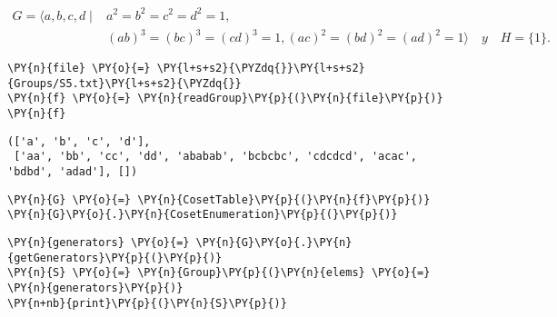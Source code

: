 
\iffalse
\newpage 
\begin{align*}
   G = \langle a,b,c,d \; | \; & a^2 = b^2 = c^2 = d^2 = 1,  \\
                            &(ab)^3 = (bc)^3 = (cd)^3 = 1, (ac)^2 = (bd)^2 = (ad)^2 = 1\rangle \quad y \quad H=\{1\}. 
\end{align*}



\begin{enumerate} 

    \begin{tcolorbox}[breakable, size=fbox, boxrule=1pt, pad at break*=1mm,colback=cellbackground, colframe=cellborder]
\begin{Verbatim}[commandchars=\\\{\}]
\PY{n}{file} \PY{o}{=} \PY{l+s+s2}{\PYZdq{}}\PY{l+s+s2}{Groups/S5.txt}\PY{l+s+s2}{\PYZdq{}}
\PY{n}{f} \PY{o}{=} \PY{n}{readGroup}\PY{p}{(}\PY{n}{file}\PY{p}{)}
\PY{n}{f}
\end{Verbatim}
\end{tcolorbox}

            \begin{tcolorbox}[breakable, size=fbox, boxrule=.5pt, pad at break*=1mm, opacityfill=0]
\begin{Verbatim}[commandchars=\\\{\}]
(['a', 'b', 'c', 'd'],
 ['aa', 'bb', 'cc', 'dd', 'ababab', 'bcbcbc', 'cdcdcd', 'acac', 'bdbd', 'adad'], [])
\end{Verbatim}
\end{tcolorbox}
        
    \begin{tcolorbox}[breakable, size=fbox, boxrule=1pt, pad at break*=1mm,colback=cellbackground, colframe=cellborder]
\begin{Verbatim}[commandchars=\\\{\}]
\PY{n}{G} \PY{o}{=} \PY{n}{CosetTable}\PY{p}{(}\PY{n}{f}\PY{p}{)}
\PY{n}{G}\PY{o}{.}\PY{n}{CosetEnumeration}\PY{p}{(}\PY{p}{)}
\end{Verbatim}
\end{tcolorbox}

    \begin{tcolorbox}[breakable, size=fbox, boxrule=1pt, pad at break*=1mm,colback=cellbackground, colframe=cellborder]
\begin{Verbatim}[commandchars=\\\{\}]
\PY{n}{generators} \PY{o}{=} \PY{n}{G}\PY{o}{.}\PY{n}{getGenerators}\PY{p}{(}\PY{p}{)}
\PY{n}{S} \PY{o}{=} \PY{n}{Group}\PY{p}{(}\PY{n}{elems} \PY{o}{=} \PY{n}{generators}\PY{p}{)}
\PY{n+nb}{print}\PY{p}{(}\PY{n}{S}\PY{p}{)}
\end{Verbatim}
\end{tcolorbox}


\end{enumerate}
